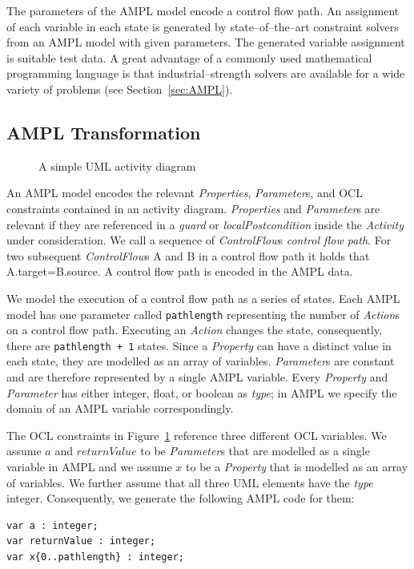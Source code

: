 \documentclass[runningheads,a4paper]{llncs}%
\newcommand{\UMLType}[1]{\textsf{\textit{#1}}} %
\newcommand{\UMLReference}[1]{\textsf{\textit{#1}}} %
\newcommand{\AMPLCode}[1]{\texttt{#1}}
\begin{document}
The parameters of the AMPL model encode a control flow path. An assignment of
each variable in each state is generated by state--of--the--art constraint
solvers from an AMPL model with given parameters. The generated variable
assignment is suitable test data. A great advantage of a commonly used
mathematical programming language is that industrial--strength solvers are
available for a wide variety of problems (see Section~\ref{sec:AMPL}).
%
\subsection{AMPL Transformation}%
\label{sec:AMPLTransformation}%
\begin{figure}%
\def\svgwidth{\textwidth}%
\graphicspath{{./pics/}}%
%
\caption{A simple UML activity diagram}%
\label{fig:AssignmentDecision}%
\end{figure}%
An AMPL model encodes the relevant \UMLType{Properties}, \UMLType{Parameter}s,
and OCL constraints contained in an activity diagram. \UMLType{Properties} and
\UMLType{Parameter}s are relevant if they are referenced in a
\UMLReference{guard} or \UMLReference{localPostcondition} inside the
\UMLType{Activity} under consideration. We call a sequence of
\UMLReference{ControlFlow}s \emph{control flow path}. For two subsequent
\UMLType{ControlFlow}s A and B in a control flow path it holds that
A.target=B.source. A control flow path is encoded in the AMPL data.

We model the execution of a control flow path as a series of states. Each AMPL
model has one parameter called \AMPLCode{pathlength} representing the number of
\UMLType{Action}s on a control flow path. Executing an \UMLType{Action} changes
the state, consequently, there are \AMPLCode{pathlength + 1} states. Since a
\UMLType{Property} can have a distinct value in each state, they are modelled as
an array of variables. \UMLType{Parameter}s are constant and are therefore
represented by a single AMPL variable. Every \UMLType{Property} and
\UMLType{Parameter} has either integer, float, or boolean as
\UMLReference{type}; in AMPL we specify the domain of an AMPL variable
correspondingly.

The OCL constraints in Figure~\ref{fig:AssignmentDecision} reference three
different OCL variables. We assume $a$ and $returnValue$ to be
\UMLType{Parameter}s that are modelled as a single variable in AMPL and we
assume $x$ to be a \UMLType{Property} that is modelled as an array of variables.
We further assume that all three UML elements have the \UMLReference{type}
integer. Consequently, we generate the following AMPL code for them: %
\begin{lstlisting}[basicstyle=\ttfamily,language=ampl]
var a : integer;
var returnValue : integer;
var x{0..pathlength} : integer;
\end{lstlisting}%
\end{document}
